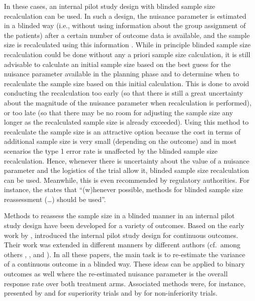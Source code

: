 In these cases, an internal pilot study design with blinded sample size
recalculation can be used. In such a design, the nuisance parameter is
estimated in a blinded way (i.e., without using information about the
group assignment of the patients) after a certain number of outcome data
is available, and the sample size is recalculated using this information
\citep{Wittes1990}. While in principle blinded sample size recalculation
could be done without any a priori sample size calculation, it is still
advisable to calculate an initial sample size based on the best guess
for the nuisance parameter available in the planning phase and to
determine when to recalculate the sample size based on this initial
calculation. This is done to avoid conducting the recalculation too
early (so that there is still a great uncertainty about the magnitude of
the nuisance parameter when recalculation is performed), or too late (so
that there may be no room for adjusting the sample size any longer as
the recalculated sample size is already exceeded). Using this method to
recalculate the sample size is an attractive option because the cost in
terms of additional sample size is very small (depending on the outcome)
and in most scenarios the type 1 error rate is unaffected by the blinded
sample size recalculation. Hence, whenever there is uncertainty about
the value of a nuisance parameter and the logistics of the trial allow
it, blinded sample size recalculation can be used. Meanwhile, this is
even recommended by regulatory authorities. For instance, the
\citet{CHMP} states that ``(w)henever possible, methods for blinded
sample size reassessment (\ldots) should be used''.

Methods to reassess the sample size in a blinded manner in an internal
pilot study design have been developed for a variety of outcomes. Based
on the early work by \citet{Stein}, \citet{Wittes1990} introduced the
internal pilot study design for continuous outcomes. Their work was
extended in different manners by different authors (cf.~among others
\citet{Birkett1994}, \citet{Denne1999}, and \citet{KF2000}). In all
these papers, the main task is to re-estimate the variance of a
continuous outcome in a blinded way. These ideas can be applied to
binary outcomes as well where the re-estimated nuisance parameter is the
overall response rate over both treatment arms. Associated methods were,
for instance, presented by \citet{Gould1992} and \citet{FK2004} for
superiority trials and by \citet{Friede2007} for non-inferiority trials.

